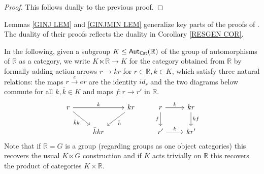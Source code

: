 \documentclass[a4paper,10pt
 ,draft
]{article}%
\begin{document}
\begin{proof}
This follows dually to the previous proof.
\end{proof}

\begin{remark}
Lemmas \ref{GINJ LEM} and \ref{GINJMIN LEM} generalize key parts of the proofs of \cite[Lemmas 5.3 and 5.5]{BM11}.  
The duality of their proofs reflects the duality in 
Corollary \ref{RESGEN COR}.
\end{remark}


In the following, given a subgroup $K \leq \mathsf{Aut}_{\mathsf{Cat}}(\mathbb{R})$ of the group of automorphisms of $\mathbb R$ as a category,
we write $K \ltimes \mathbb{R} \to K$ 
for the category obtained from $\mathbb{R}$ by formally adding action arrows
$r \to kr$ for $r \in \mathbb{R},k \in K$,
which satisfy three natural relations:
the maps $r \xrightarrow{e} e r$
are the identity $id_r$ and the two diagrams below commute
for all $k,\bar{k} \in K$ and maps $f: r \to r'$ in $\mathbb R$.
%
\[
      \begin{tikzcd}%
            r \arrow[rr, "k"] \arrow[dr, "\bar{k}k"']
            &&
            k r \arrow[dl, "\bar{h}"]
            & %
            r \arrow[r, "k"] \arrow[d, "f"']
            &
            k r \arrow[d, "k f"]
            \\
            &
            \bar{k} k r
            &
            & %
            r' \arrow[r, "k"]
            &
            k r'
      \end{tikzcd}
\]
Note that 
if $\mathbb{R}=G$ is a group (regarding groups as one object categories) this recovers the usual $K \ltimes G$ construction and
if $K$ acts trivially on $\mathbb{R}$ this recovers the product of categories $K \times \mathbb{R}$.
\end{document}
